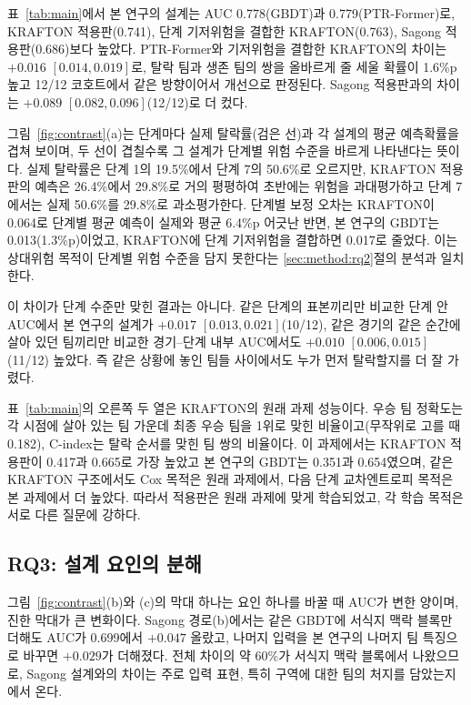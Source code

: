 표~\ref{tab:main}에서 본 연구의 설계는 AUC 0.778(GBDT)과 0.779(PTR-Former)로, KRAFTON 적용판(0.741), 단계 기저위험을 결합한 KRAFTON(0.763), Sagong 적용판(0.686)보다 높았다.
PTR-Former와 기저위험을 결합한 KRAFTON의 차이는 $+0.016$ $[0.014, 0.019]$로, 탈락 팀과 생존 팀의 쌍을 올바르게 줄 세울 확률이 1.6\%p 높고 12/12 코호트에서 같은 방향이어서 개선으로 판정된다.
Sagong 적용판과의 차이는 $+0.089$ $[0.082, 0.096]$(12/12)로 더 컸다.

그림~\ref{fig:contrast}(a)는 단계마다 실제 탈락률(검은 선)과 각 설계의 평균 예측확률을 겹쳐 보이며, 두 선이 겹칠수록 그 설계가 단계별 위험 수준을 바르게 나타낸다는 뜻이다.
실제 탈락률은 단계 1의 19.5\%에서 단계 7의 50.6\%로 오르지만, KRAFTON 적용판의 예측은 26.4\%에서 29.8\%로 거의 평평하여 초반에는 위험을 과대평가하고 단계 7에서는 실제 50.6\%를 29.8\%로 과소평가한다.
단계별 보정 오차는 KRAFTON이 0.064로 단계별 평균 예측이 실제와 평균 6.4\%p 어긋난 반면, 본 연구의 GBDT는 0.013(1.3\%p)이었고, KRAFTON에 단계 기저위험을 결합하면 0.017로 줄었다.
이는 상대위험 목적이 단계별 위험 수준을 담지 못한다는 \ref{sec:method:rq2}절의 분석과 일치한다.

이 차이가 단계 수준만 맞힌 결과는 아니다.
같은 단계의 표본끼리만 비교한 단계 안 AUC에서 본 연구의 설계가 $+0.017$ $[0.013, 0.021]$(10/12), 같은 경기의 같은 순간에 살아 있던 팀끼리만 비교한 경기--단계 내부 AUC에서도 $+0.010$ $[0.006, 0.015]$(11/12) 높았다.
즉 같은 상황에 놓인 팀들 사이에서도 누가 먼저 탈락할지를 더 잘 가렸다.

표~\ref{tab:main}의 오른쪽 두 열은 KRAFTON의 원래 과제 성능이다.
우승 팀 정확도는 각 시점에 살아 있는 팀 가운데 최종 우승 팀을 1위로 맞힌 비율이고(무작위로 고를 때 0.182), C-index는 탈락 순서를 맞힌 팀 쌍의 비율이다.
이 과제에서는 KRAFTON 적용판이 0.417과 0.665로 가장 높았고 본 연구의 GBDT는 0.351과 0.654였으며, 같은 KRAFTON 구조에서도 Cox 목적은 원래 과제에서, 다음 단계 교차엔트로피 목적은 본 과제에서 더 높았다.
따라서 적용판은 원래 과제에 맞게 학습되었고, 각 학습 목적은 서로 다른 질문에 강하다.

\subsection{RQ3: 설계 요인의 분해}
\label{sec:results:rq3}

그림~\ref{fig:contrast}(b)와 (c)의 막대 하나는 요인 하나를 바꿀 때 AUC가 변한 양이며, 진한 막대가 큰 변화이다.
Sagong 경로(b)에서는 같은 GBDT에 서식지 맥락 블록만 더해도 AUC가 0.699에서 $+0.047$ 올랐고, 나머지 입력을 본 연구의 나머지 팀 특징으로 바꾸면 $+0.029$가 더해졌다.
전체 차이의 약 60\%가 서식지 맥락 블록에서 나왔으므로, Sagong 설계와의 차이는 주로 입력 표현, 특히 구역에 대한 팀의 처지를 담았는지에서 온다.

